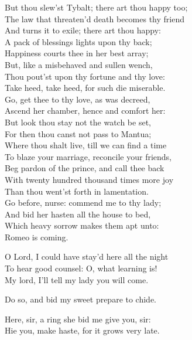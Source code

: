 \begin{speech}
But thou slew'st Tybalt; there art thou happy too; \\
The law that threaten'd death becomes thy friend \\
And turns it to exile; there art thou happy: \\
A pack of blessings lights upon thy back; \\
Happiness courts thee in her best array; \\
But, like a misbehaved and sullen wench, \\
Thou pout'st upon thy fortune and thy love: \\
Take heed, take heed, for such die miserable. \\
Go, get thee to thy love, as was decreed, \\
Ascend her chamber, hence and comfort her: \\
But look thou stay not the watch be set, \\
For then thou canst not pass to Mantua; \\
Where thou shalt live, till we can find a time \\
To blaze your marriage, reconcile your friends, \\
Beg pardon of the prince, and call thee back \\
With twenty hundred thousand times more joy \\
Than thou went'st forth in lamentation. \\
Go before, nurse: commend me to thy lady; \\
And bid her hasten all the house to bed, \\
Which heavy sorrow makes them apt unto: \\
Romeo is coming. \\
\end{speech}
\begin{speech}
O Lord, I could have stay'd here all the night \\

To hear good counsel: O, what learning is! \\
My lord, I'll tell my lady you will come. \\
\end{speech}
\begin{speech}
Do so, and bid my sweet prepare to chide. \\
\end{speech}
\begin{speech}
Here, sir, a ring she bid me give you, sir: \\
Hie you, make haste, for it grows very late.  \\

\end{speech}
